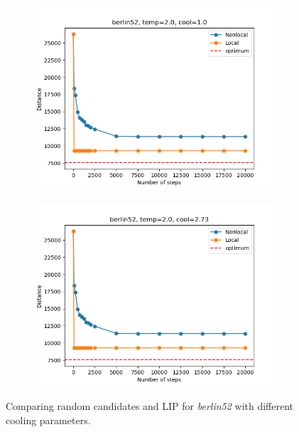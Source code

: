 \begin{figure}[!htb]
	\centering
	\begin{subfigure}{0.45\textwidth}
		\includegraphics[width=\textwidth]{img/berlin52_temp=2.0_cool=1.0}
	\end{subfigure}
	\begin{subfigure}{0.45\textwidth}
		\includegraphics[width=\textwidth]{img/berlin52_temp=2.0_cool=2.73}
	\end{subfigure}
	\caption{Comparing random candidates and LIP for \textit{berlin52} with different cooling parameters.}
	\label{fig:berlin52_comp}
\end{figure}
	
